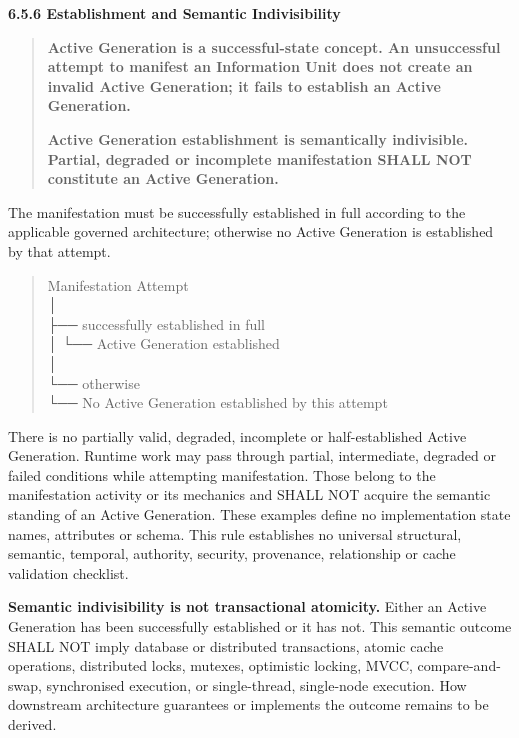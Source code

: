 \par\medskip\textbf{6.5.6 Establishment and Semantic Indivisibility}\par


\begin{quote}


\textbf{Active Generation is a successful-state concept. An unsuccessful attempt to manifest an Information Unit does not create an invalid Active Generation; it fails to establish an Active Generation.}



\textbf{Active Generation establishment is semantically indivisible. Partial, degraded or incomplete manifestation SHALL NOT constitute an Active Generation.}



\end{quote}


The manifestation must be successfully established in full according to the
applicable governed architecture; otherwise no Active Generation is established
by that attempt.



\begin{quote}\small\ttfamily
Manifestation Attempt\\
      │\\
      ├── successfully established in full\\
      │           └── Active Generation established\\
      │\\
      └── otherwise\\
                  └── No Active Generation established by this attempt\\

\end{quote}


There is no partially valid, degraded, incomplete or half-established Active
Generation. Runtime work may pass through partial, intermediate, degraded or
failed conditions while attempting manifestation. Those belong to the
manifestation activity or its mechanics and SHALL NOT acquire the semantic
standing of an Active Generation. These examples define no implementation state
names, attributes or schema. This rule establishes no universal structural,
semantic, temporal, authority, security, provenance, relationship or cache
validation checklist.



\textbf{Semantic indivisibility is not transactional atomicity.} Either an Active
Generation has been successfully established or it has not. This semantic outcome
SHALL NOT imply database or distributed transactions, atomic cache operations,
distributed locks, mutexes, optimistic locking, MVCC, compare-and-swap,
synchronised execution, or single-thread, single-node execution. How downstream
architecture guarantees or implements the outcome remains to be derived.



